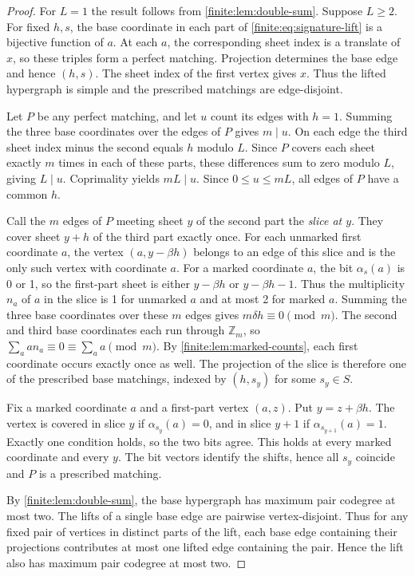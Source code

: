 \documentclass[10pt]{article}
\numberwithin{equation}{section}
\begin{document}
\begin{proof}
For $L=1$ the result follows from \cref{finite:lem:double-sum}. Suppose $L\ge2$. For fixed $h,s$, the base coordinate in each part of \cref{finite:eq:signature-lift} is a bijective function of $a$. At each $a$, the corresponding sheet index is a translate of $x$, so these triples form a perfect matching. Projection determines the base edge and hence $(h,s)$. The sheet index of the first vertex gives $x$. Thus the lifted hypergraph is simple and the prescribed matchings are edge-disjoint.

Let $P$ be any perfect matching, and let $u$ count its edges with $h=1$.
Summing the three base coordinates over the edges of $P$ gives $m\mid u$. On each edge the third sheet index minus the second equals $h$ modulo $L$. Since $P$ covers each sheet exactly $m$ times in each of these parts, these differences sum to zero modulo $L$, giving $L\mid u$. Coprimality yields $mL\mid u$.
Since $0\le u\le mL$, all edges of $P$ have a common $h$.

Call the $m$ edges of $P$ meeting sheet $y$ of the second part the \emph{slice at $y$}. They cover sheet $y+h$ of the third part exactly once. For each unmarked first coordinate $a$, the vertex $(a,y-\beta h)$ belongs to an edge of this slice and is the only such vertex with coordinate $a$. For a marked coordinate $a$, the bit $\alpha_s(a)$ is 0 or 1, so the first-part sheet is either $y-\beta h$ or $y-\beta h-1$. Thus the multiplicity $n_a$ of $a$ in the slice is 1 for unmarked $a$ and at most 2 for marked $a$. Summing the three base coordinates over these $m$ edges gives $m\delta h\equiv0\pmod m$. The second and third base coordinates each run through $\mathbb Z_m$, so $\sum_a a n_a\equiv0\equiv\sum_a a\pmod m$. By \cref{finite:lem:marked-counts}, each first coordinate occurs exactly once as well. The projection of the slice is therefore one of the prescribed base matchings, indexed by $(h,s_y)$ for some $s_y\in S$.

Fix a marked coordinate $a$ and a first-part vertex $(a,z)$. Put $y=z+\beta h$. The vertex is covered in slice $y$ if $\alpha_{s_y}(a)=0$, and in slice $y+1$ if $\alpha_{s_{y+1}}(a)=1$. Exactly one condition holds, so the two bits agree. This holds at every marked coordinate and every $y$. The bit vectors identify the shifts, hence all $s_y$ coincide and $P$ is a prescribed matching.

By \cref{finite:lem:double-sum}, the base hypergraph has maximum pair codegree at most two. The lifts of a single base edge are pairwise vertex-disjoint. Thus for any fixed pair of vertices in distinct parts of the lift, each base edge containing their projections contributes at most one lifted edge containing the pair. Hence the lift also has maximum pair codegree at most two.
\end{proof}
\end{document}
